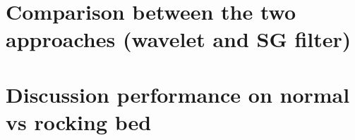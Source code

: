 









\section{Comparison between the two approaches  (wavelet and SG filter)}
\section{Discussion performance on normal vs rocking bed }


